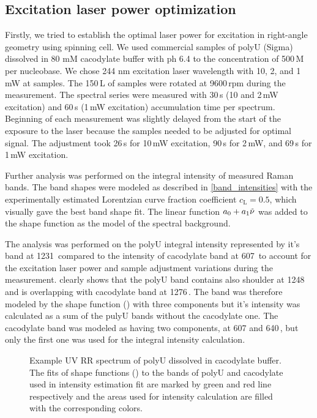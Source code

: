 \subsection{Excitation laser power optimization}

Firstly, we tried to establish the optimal laser power for excitation in
right-angle geometry using spinning cell. We used commercial samples of polyU
(Sigma) dissolved in 80 mM cacodylate buffer with ph 6.4 to the concentration
of 500\,M per nucleobase. We chose 244 nm excitation laser wavelength with
10, 2, and 1 mW at samples. The 150\,L of samples were rotated at
9600\,rpm during the measurement. The spectral series were measured with 30\,s
(10 and 2\,mW excitation) and 60\,s (1\,mW excitation) accumulation time per
spectrum. Beginning of each measurement was slightly delayed from the start of
the exposure to the laser because the samples needed to be adjusted for
optimal signal. The adjustment took 26\,s for 10\,mW excitation, 90\,s for
2\,mW, and 69\,s for 1\,mW excitation.

Further analysis was performed on the integral intensity of measured Raman
bands. The band shapes were modeled as described in
\cref{band_intensities}
with the experimentally estimated Lorentzian curve fraction coefficient
$c_\text{L} = 0.5$, which visually gave the best band shape fit. The
linear function $a_0 + a_1\tilde{\nu}$ was added to the shape function
as the model of the spectral background.

The analysis was performed on the polyU integral intensity represented by
it's band at 1231\,\icm{} compared to the intensity of cacodylate band at
607\,\icm{} to account for the excitation laser power and sample adjustment
variations during the measurement.
clearly shows that the polyU band contains also shoulder at 1248\,\icm{} and
is overlapping with cacodylate band at 1276\,\icm. The band was therefore
modeled by the shape function
()
with three components but it's intensity was calculated as a sum of the pulyU
bands without the cacodylate one. The cacodylate band was modeled as having
two components, at 607 and 640\,\icm, but only the first one was used for the
integral intensity calculation.

\begin{figure}
	\centering
	
	\caption{Example UV RR spectrum of polyU dissolved in cacodylate buffer. The
		fits of shape functions () to the bands of
		polyU and cacodylate used in intensity estimation fit are marked by green
		and red line respectively and the areas used for intensity calculation are
		filled with the corresponding colors.}
	\label{\figlabel{power_optim:triplexes_pU}}
\end{figure}

